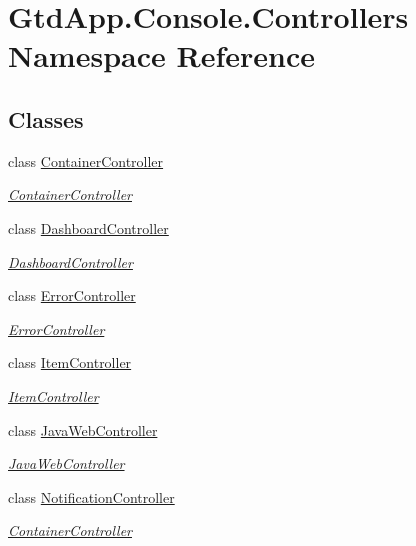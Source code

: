 \hypertarget{namespace_gtd_app_1_1_console_1_1_controllers}{}\section{Gtd\+App.\+Console.\+Controllers Namespace Reference}
\label{namespace_gtd_app_1_1_console_1_1_controllers}
\subsection*{Classes}
\begin{DoxyCompactItemize}
\item 
class \mbox{\hyperlink{class_gtd_app_1_1_console_1_1_controllers_1_1_container_controller}{Container\+Controller}}
\begin{DoxyCompactList}\small\item\em \mbox{\hyperlink{class_gtd_app_1_1_console_1_1_controllers_1_1_container_controller}{Container\+Controller}} \end{DoxyCompactList}\item 
class \mbox{\hyperlink{class_gtd_app_1_1_console_1_1_controllers_1_1_dashboard_controller}{Dashboard\+Controller}}
\begin{DoxyCompactList}\small\item\em \mbox{\hyperlink{class_gtd_app_1_1_console_1_1_controllers_1_1_dashboard_controller}{Dashboard\+Controller}} \end{DoxyCompactList}\item 
class \mbox{\hyperlink{class_gtd_app_1_1_console_1_1_controllers_1_1_error_controller}{Error\+Controller}}
\begin{DoxyCompactList}\small\item\em \mbox{\hyperlink{class_gtd_app_1_1_console_1_1_controllers_1_1_error_controller}{Error\+Controller}} \end{DoxyCompactList}\item 
class \mbox{\hyperlink{class_gtd_app_1_1_console_1_1_controllers_1_1_item_controller}{Item\+Controller}}
\begin{DoxyCompactList}\small\item\em \mbox{\hyperlink{class_gtd_app_1_1_console_1_1_controllers_1_1_item_controller}{Item\+Controller}} \end{DoxyCompactList}\item 
class \mbox{\hyperlink{class_gtd_app_1_1_console_1_1_controllers_1_1_java_web_controller}{Java\+Web\+Controller}}
\begin{DoxyCompactList}\small\item\em \mbox{\hyperlink{class_gtd_app_1_1_console_1_1_controllers_1_1_java_web_controller}{Java\+Web\+Controller}} \end{DoxyCompactList}\item 
class \mbox{\hyperlink{class_gtd_app_1_1_console_1_1_controllers_1_1_notification_controller}{Notification\+Controller}}
\begin{DoxyCompactList}\small\item\em \mbox{\hyperlink{class_gtd_app_1_1_console_1_1_controllers_1_1_container_controller}{Container\+Controller}} \end{DoxyCompactList}\end{DoxyCompactItemize}

